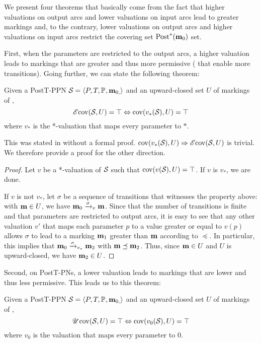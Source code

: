 We present four theorems that basically come from the fact that
higher valuations on output arcs and lower valuations on input arcs lead to greater markings and, to the contrary,
lower valuations on output arcs and higher valuations on input arcs restrict the covering set $\operatorname{Post}^*_{}(\mathbf{m}_0)$ set.

First, when the parameters are restricted to the output arcs, a higher valuation leads to markings that are greater and thus more permissive ( that enable more transitions).
Going further, we can state the following theorem:
\begin{theo}
  \label{theo:post-e-star-val}
  Given a PostT-\ac{PPN} $\mathcal{S}_{} = \left\langle P_{}, T_{}, \mathbb{P}_{}, \mathbf{m}_{0,}\right\rangle$ and an upward-closed set $U$ of markings of \namePPN, \[\operatorname{\mathscr{E}cov}(\mathcal{S}_{}, U) = \top \Leftrightarrow \operatorname{cov}(v_*(\mathcal{S}_{}), U) = \top\] where $v_*$ is the *-valuation that maps every parameter to $*$.
\end{theo}

This was stated in \cite{David17} without a formal proof.
$\operatorname{cov}(v_*(\mathcal{S}_{}), U) \Rightarrow \operatorname{\mathscr{E}cov}(\mathcal{S}_{}, U)$ is trivial.
We therefore provide a proof for the other direction.


\begin{proof}
  Let $v$ be a *-valuation of $\mathcal{S}_{}$ such that $\operatorname{cov}(v(\mathcal{S}_{}), U) = \top$.
  If $v$ is $v_*$, we are done.

  If $v$ is not $v_*$, let $\sigma$ be a sequence of transitions that witnesses the property above: with $\mathbf{m} \in U$, we have $\mari \fire[\val]{\sigma} \mar$.
  Since that the number of transitions is finite and that parameters are restricted to output arcs, it is easy to see that any other valuation $v'$ that maps each parameter $p$ to a value greater or equal to $v(p)$ allows $\sigma$ to lead to a marking $\mathbf{m}_1$ greater than $\mathbf{m}$ according to $\preceq$.
  In particular, this implies that $\mari \fire[\val_*]{\sigma} \mar_2$ with $\mathbf{m} \preceq \mathbf{m}_2$.
  Thus, since $\mathbf{m} \in U$ and $U$ is upward-closed, we have $\mathbf{m}_2 \in U$.
\end{proof}

Second, on PostT-\acp{PN}, a lower valuation leads to markings that are lower and thus less permissive.
This leads us to this theorem:
\begin{theo}
  \label{theo:post-u-zero-val}
  Given a PostT-\ac{PPN} $\mathcal{S}_{} = \left\langle P_{}, T_{}, \mathbb{P}_{}, \mathbf{m}_{0,}\right\rangle$ and an upward-closed set $U$ of markings of \namePPN, \[\operatorname{\mathscr{U}cov}(\mathcal{S}_{}, U) = \top \Leftrightarrow \operatorname{cov}(v_0(\mathcal{S}_{}), U) = \top\] where $v_0$ is the valuation that maps every parameter to $0$.
\end{theo}

